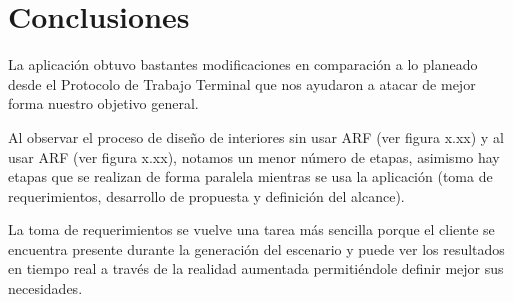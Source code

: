 \chapter{Conclusiones}

La aplicación obtuvo bastantes modificaciones en comparación a lo planeado desde el Protocolo de Trabajo Terminal que nos ayudaron a atacar de mejor forma nuestro objetivo general.\par
Al observar el proceso de diseño de interiores sin usar ARF (ver figura x.xx) y al usar ARF (ver figura x.xx), notamos un menor número de etapas, asimismo hay etapas que se realizan de forma paralela mientras se usa la aplicación (toma de requerimientos, desarrollo de propuesta y definición del alcance).\par
La toma de requerimientos se vuelve una tarea más sencilla porque el cliente se encuentra presente durante la generación del escenario y puede ver los resultados en tiempo real a través de la realidad aumentada permitiéndole definir mejor sus necesidades.